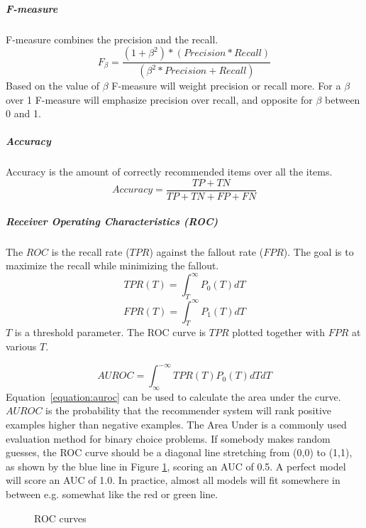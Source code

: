 \subparagraph{F-measure}
F-measure combines the precision and the recall.
\begin{equation}
    F_\beta = \frac{(1 + \beta^2) * (Precision * Recall)}{(\beta^2 * Precision + Recall)}
    \label{equation:f-measure}
\end{equation}
Based on the value of $\beta$ F-measure will weight precision or recall more. For a $\beta$ over 1 F-measure will emphasize precision over recall, and opposite for $\beta$ between 0 and 1.

\subparagraph{Accuracy}
Accuracy is the amount of correctly recommended items over all the items.
\begin{equation}
    Accuracy = \frac{TP+TN}{TP+TN+FP+FN}
    \label{equation:accuracy}
\end{equation}

\subparagraph{Receiver Operating Characteristics (ROC)}
The $ROC$ is the recall rate ($TPR$) against the fallout rate ($FPR$).
The goal is to maximize the recall while minimizing the fallout.
\begin{equation}
    TPR(T) = \int_T^\infty P_0(T)dT
    \label{equation:tpr}
\end{equation}
\begin{equation}
    FPR(T) = \int_T^\infty P_1(T)dT
    \label{equation:fpr}
\end{equation}
$T$ is a threshold parameter.
The ROC curve is $TPR$ plotted together with $FPR$ at various $T$.

\begin{equation}
    AUROC = \int_\infty^{-\infty} TPR(T)P_0(T)dTdT
    \label{equation:auroc}
\end{equation}
Equation~\ref{equation:auroc} can be used to calculate the area under the curve.
$AUROC$ is the probability that the recommender system will rank positive examples higher than negative examples.
The Area Under is a commonly used evaluation method for binary choice problems. If somebody makes random guesses,
the ROC curve should be a diagonal line stretching from (0,0) to (1,1), as shown by the blue line in Figure \ref{fig:aucroc}, scoring an AUC of 0.5. A perfect model will score an AUC of 1.0. In practice, almost all models will fit somewhere in between e.g. somewhat like the red or green line.

\begin{figure}[H]
\label{fig:aucroc}
  \centering
    \caption{ROC curves}
\end{figure}

